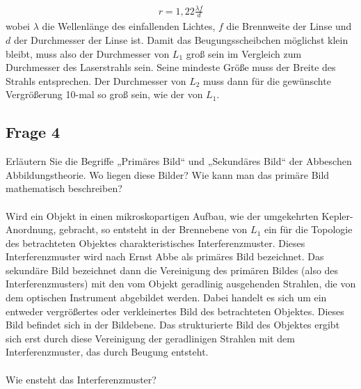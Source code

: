 \documentclass[a4paper,10pt]{scrartcl}
\begin{document}
			\begin{align*}
			r=1,22\frac{\lambda f}{d}
			\end{align*}
			wobei \(\lambda\) die Wellenlänge des einfallenden Lichtes, \(f\) die Brennweite der Linse und \(d\) der Durchmesser der Linse ist. Damit das Beugungsscheibchen möglichst klein bleibt, muss also der Durchmesser von \(L_{1}\) groß sein im Vergleich zum Durchmesser des Laserstrahls sein. Seine mindeste Größe muss der Breite des Strahls entsprechen. Der Durchmesser von \(L_{2}\) muss dann für die gewünschte Vergrößerung 10-mal so groß sein, wie der von \(L_{1}\).
			
		\subsection{Frage 4}
			Erläutern Sie die Begriffe „Primäres Bild“ und „Sekundäres Bild“ der Abbeschen Abbildungstheorie.
			Wo liegen diese Bilder? Wie kann man das primäre Bild mathematisch beschreiben?\\
			\\
			Wird ein Objekt in einen mikroskopartigen Aufbau, wie der umgekehrten Kepler-Anordnung, gebracht, so entsteht in der Brennebene von \(L_{1}\) ein für die Topologie des betrachteten Objektes charakteristisches Interferenzmuster. Dieses Interferenzmuster wird nach Ernst Abbe als primäres Bild bezeichnet. Das sekundäre Bild bezeichnet dann die Vereinigung des primären Bildes (also des Interferenzmusters) mit den vom Objekt geradlinig ausgehenden Strahlen, die von dem optischen Instrument abgebildet werden. Dabei handelt es sich um ein entweder vergrößertes oder verkleinertes Bild des betrachteten Objektes. Dieses Bild befindet sich in der Bildebene. Das strukturierte Bild des Objektes ergibt sich erst durch diese Vereinigung der geradlinigen Strahlen mit dem Interferenzmuster, das durch Beugung entsteht.\\
			\\
			Wie ensteht das Interferenzmuster?\\
			\\
\end{document}
